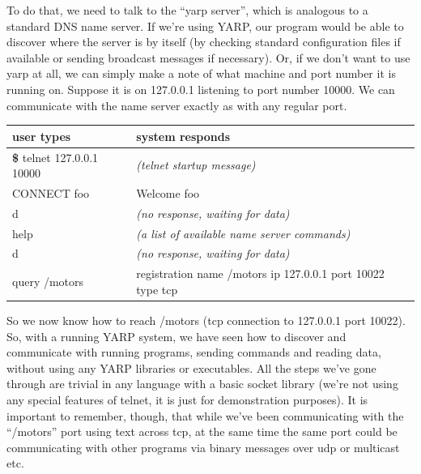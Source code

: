 To do that, we need to talk to the ``yarp server'', which is analogous
to a standard DNS name server.  If we're using YARP, our program would
be able to discover where the server is by itself (by checking
standard configuration files if available or sending broadcast
messages if necessary).  Or, if we don't want to use yarp at all, we
can simply make a note of what machine and port number it is running
on.  Suppose it is on 127.0.0.1 listening to port number 10000.
We can communicate with the name server exactly as with any regular
port.


\begin{center}
\begin{tabular}{lp{8cm}}
\hline\hline
{\bf user types} & {\bf system responds} \\
\hline
{\bf \$} telnet 127.0.0.1 10000 & {\it (telnet startup message)} \\
CONNECT foo & Welcome foo \\
 d & {\it (no response, waiting for data)} \\
 help & {\it (a list of available name server commands)} \\
 d & {\it (no response, waiting for data)} \\
 {query /motors} &  registration name /motors ip 127.0.0.1 port 10022 type tcp \\
\hline\hline
\end{tabular}
\end{center}


So we now know how to reach /motors (tcp connection to 127.0.0.1 port 10022).
%
So, with a running YARP system, we have seen how to discover
and communicate with running programs, sending commands and reading
data, without using any YARP libraries or executables.  All the steps
we've gone through are trivial in any language with a basic socket
library (we're not using any special features of telnet, it is just
for demonstration purposes).  It is important to remember, though,
that while we've been communicating with the ``/motors'' port using
text across tcp, at the same time the same port could be communicating
with other programs via binary messages over udp or multicast etc.



